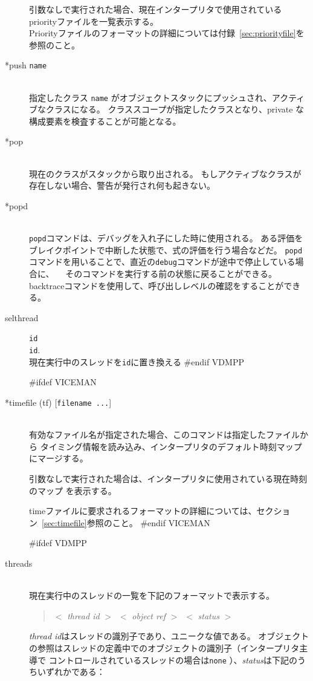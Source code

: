 \documentclass[\pformat,12pt]{article}
\begin{document}
\begin{description}
  引数なしで実行された場合、現在インタープリタで使用されているpriorityファイルを一覧表示する。\\

  Priorityファイルのフォーマットの詳細については付録~\ref{sec:priorityfile}を参照のこと。

\item[*push {\tt name}] \mbox{}\\
  指定したクラス {\tt name} がオブジェクトスタックにプッシュされ、アクティブなクラスになる。 
  クラススコープが指定したクラスとなり、private な構成要素を検査することが可能となる。

\item[*pop] \mbox{}\\
  現在のクラスがスタックから取り出される。
  もしアクティブなクラスが存在しない場合、警告が発行され何も起きない。
  
\item[*popd] \mbox{}\\
  {\tt popd}コマンドは、デバッグを入れ子にした時に使用される。
  ある評価をブレイクポイントで中断した状態で、式の評価を行う場合などだ。
  {\tt popd}コマンドを用いることで、直近の{\tt debug}コマンドが途中で停止している場合に、
　そのコマンドを実行する前の状態に戻ることができる。
  backtraceコマンドを使用して、呼び出しレベルの確認をすることができる。

\item[selthread]\texttt{id}\mbox{}\\
  \texttt{id}. \\
  現在実行中のスレッドを\texttt{id}に置き換える
#endif VDMPP

#ifdef VICEMAN
\item[*timefile (tf) \mbox{[{\tt filename ...}]}] \mbox{}\\
  有効なファイル名が指定された場合、このコマンドは指定したファイルから
  タイミング情報を読み込み、インタープリタのデフォルト時刻マップにマージする。

  引数なしで実行された場合は、インタープリタに使用されている現在時刻のマップ
  を表示する。
  
  timeファイルに要求されるフォーマットの詳細については、セクション~\ref{sec:timefile}参照のこと。
#endif VICEMAN

#ifdef VDMPP
\item[threads]\mbox{}\\
現在実行中のスレッドの一覧を下記のフォーマットで表示する。
\begin{quote}
  $<$ \textit{thread id} $>$\ $<$ \textit{object ref} $>$\ $<$
\textit{status} $>$
\end{quote}
\textit{thread id}はスレッドの識別子であり、ユニークな値である。
オブジェクトの参照はスレッドの定義中でのオブジェクトの識別子（インタープリタ主導で
コントロールされているスレッドの場合は\texttt{none} ）、\textit{status}は下記のうちいずれかである：


\end{description}
\end{document}
